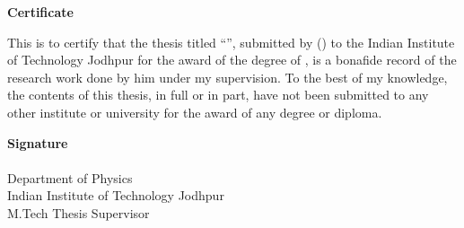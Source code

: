 

\begin{flushright}
\huge{\textbf{Certificate}}
\end{flushright}
  This is to certify that the thesis titled ``\emph{\ttitle{}}'', submitted by \authorname{} (\rn{}) to the Indian Institute of Technology Jodhpur for the award of the degree of \degree{}, is a bonafide record of the research work done by him under my supervision. To the best of my knowledge, the contents of this thesis, in full or in part, have not been submitted to any other institute or university for the award of any degree or diploma.
\vspace{2cm}
\begin{flushright}
\large{\textbf{Signature}}\\
\supname\\
Department of Physics\\
Indian Institute of Technology Jodhpur\\
M.Tech Thesis Supervisor
\end{flushright}
